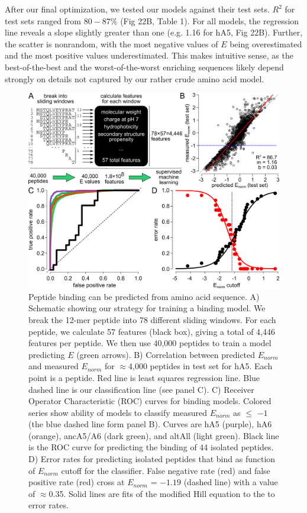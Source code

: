 After our final optimization, we tested our models against their test
sets. $R^{2}$ for test sets ranged from $80-87\%$ (Fig 22B, Table
1). For all models, the regression line reveals a slope slightly greater
than one (e.g. 1.16 for hA5, Fig 22B). Further, the scatter is nonrandom,
with the most negative values of $E$ being overestimated and the
most positive values underestimated. This makes intuitive sense, as
the best-of-the-best and the worst-of-the-worst enriching sequences
likely depend strongly on details not captured by our rather crude
amino acid model. 

\begin{figure}%
\centering
	\includegraphics{ch6-fig4.png} 
\caption[Peptide binding can be predicted from amino acid sequence]{Peptide binding can be predicted from amino acid sequence. A) Schematic showing our strategy for training a binding model. We
break the 12-mer peptide into 78 different sliding windows. For each
peptide, we calculate 57 features (black box), giving a total of 4,446
features per peptide. We then use 40,000 peptides to train a model
predicting $E$ (green arrows). B) Correlation between predicted $E_{norm}$
and measured $E_{norm}$ for $\approx$4,000 peptides in test set for
hA5. Each point is a peptide. Red line is least squares regression
line. Blue dashed line is our classification line (see panel C). C)
Receiver Operator Characteristic (ROC) curves for binding models.
Colored series show ability of models to classify measured $E_{norm}$
as $\le$ $-1$ (the blue dashed line form panel B). Curves are hA5 (purple),
hA6 (orange), ancA5/A6 (dark green), and altAll (light green). Black
line is the ROC curve for predicting the binding of 44 isolated peptides.
D) Error rates for predicting isolated peptides that bind as function
of $E_{norm}$ cutoff for the classifier. False negative rate (red)
and false positive rate (red) cross at $E_{norm}$ = $-1.19$ (dashed line)
with a value of $\approx$0.35. Solid lines are fits of the modified
Hill equation to the to error rates.\label{samplefigure}}	
\end{figure}

